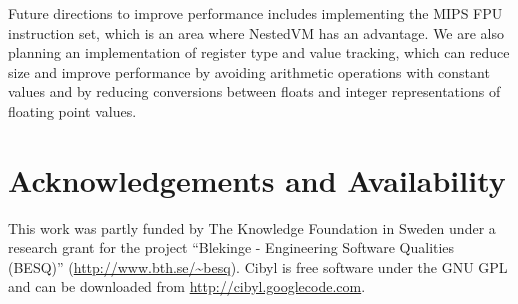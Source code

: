 Future directions to improve performance includes implementing the MIPS FPU
instruction set, which is an area where NestedVM has an advantage. We are also
planning an implementation of register type and value tracking, which can
reduce size and improve performance by avoiding arithmetic operations with
constant values and by reducing conversions between floats and integer
representations of floating point values.

\section*{Acknowledgements and Availability}
This work was partly funded by The Knowledge Foundation in Sweden under a
research grant for the project ``Blekinge - Engineering Software Qualities
(BESQ)'' (\url{http://www.bth.se/~besq}). Cibyl is free software under the GNU
GPL and can be downloaded from \url{http://cibyl.googlecode.com}.
